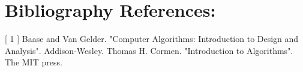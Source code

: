 \section{Bibliography References:}

[ 1 ] Baase and Van Gelder. "Computer Algorithms: Introduction to Design and Analysis". Addison-Wesley. \hfill \break \break
[ 2 ] Thomas H. Cormen. "Introduction to Algorithms". The MIT press.